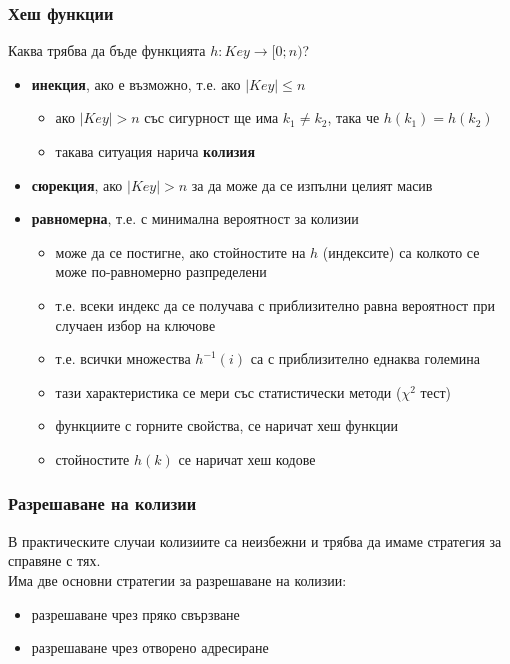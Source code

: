 \documentclass{beamer}
\begin{document}
\begin{frame}
  \frametitle{Хеш функции}
  Каква трябва да бъде функцията $h : Key \rightarrow [0; n)$?
  \begin{itemize}[<+->]
  \item \textbf{инекция}, ако е възможно\onslide<+->, т.е. ако $|Key| \leq n$
    \begin{itemize}
    \item  ако $|Key| > n$ със сигурност ще има $k_1 \neq k_2$, така че $h(k_1) = h(k_2)$
    \item такава ситуация нарича \textbf{колизия}
    \end{itemize}
  \item \textbf{сюрекция}, ако $|Key| > n$ за да може да се изпълни целият масив
  \item \textbf{равномерна}, т.е. с минимална вероятност за колизии
    \begin{itemize}
    \item може да се постигне, ако стойностите на $h$ (индексите) са колкото се може по-равномерно разпределени
    \item т.е. всеки индекс да се получава с приблизително равна вероятност при случаен избор на ключове
    \item т.е. всички множества $h^{-1}(i)$ са с приблизително еднаква големина
    \item тази характеристика се мери със статистически методи ($\chi^2$ тест)
    \item функциите с горните свойства, се наричат \alert{хеш функции}
    \item стойностите $h(k)$ се наричат \alert{хеш кодове}
    \end{itemize}
  \end{itemize}
\end{frame}

\begin{frame}
  \frametitle{Разрешаване на колизии}
  В практическите случаи колизиите са неизбежни и трябва да имаме стратегия за справяне с тях.\\[2em]
  \pause
  Има две основни стратегии за разрешаване на колизии:
  \begin{itemize}
  \item разрешаване чрез пряко свързване
  \item разрешаване чрез отворено адресиране
  \end{itemize}
\end{frame}
\end{document}
